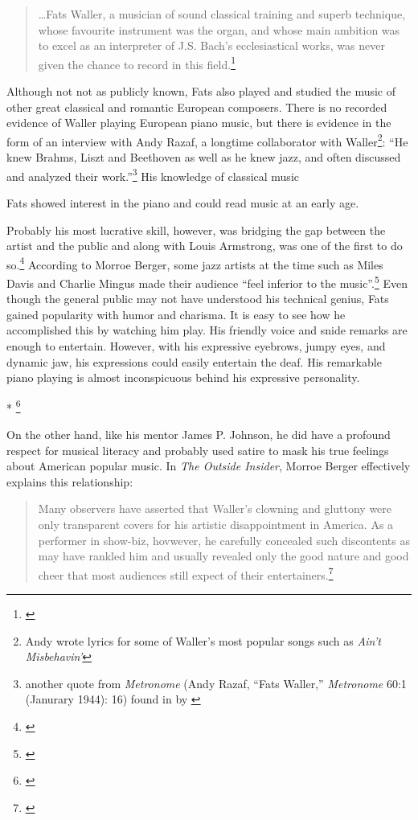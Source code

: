 \documentclass[11pt]{report}
\begin{document}
	\begin{quote}
		\ldots Fats Waller, a musician of sound classical training and superb technique, whose favourite instrument was the organ, and whose main ambition was to excel as an interpreter of J.S. Bach's ecclesiastical works, was never given the chance to record in this field.\footnote{\cite[209]{jazz_scene}}
	\end{quote}
	
	Although not not as publicly known, Fats also played and studied the music of other great classical and romantic European composers. There is no recorded evidence of Waller playing European piano music, but there is evidence in the form of an interview with Andy Razaf, a longtime collaborator with Waller\footnote{Andy wrote lyrics for some of Waller's most popular songs such as \emph{Ain't Misbehavin'}}: ``He knew Brahms, Liszt and Beethoven as well as he knew jazz, and often discussed and analyzed their work.''\footnote{another quote from \emph{Metronome} (Andy Razaf, ``Fats Waller,'' \emph{Metronome} 60:1 (Janurary 1944): 16) found in  by \cite{transcriptions}} His knowledge of classical music
	
	Fats showed interest in the piano and could read music at an early age.

	\label{sec:charisma}
	Probably his most lucrative skill, however, was bridging the gap between the artist and the public and along with Louis Armstrong, was one of the first to do so.\footnote{\cite[3]{life}} According to Morroe Berger, some jazz artists at the time such as Miles Davis and Charlie Mingus made their audience ``feel inferior to the music''.\footnote{\cite[16]{outside-insider}} Even though the general public may not have understood his technical genius, Fats gained popularity with humor and charisma. It is easy to see how he accomplished this by watching him play. His friendly voice and snide remarks are enough to entertain. However, with his expressive eyebrows, jumpy eyes, and dynamic jaw, his expressions could easily entertain the deaf. His remarkable piano playing is almost inconspicuous behind his expressive personality.
	
	* \footnote{\cite{youtube-joint_is_jumpin}}
	
		
	\label{sec:respect}
	
	On the other hand, like his mentor James P. Johnson, he did have a profound respect for musical literacy and probably used satire to mask his true feelings about American popular music. In \emph{The Outside Insider}, Morroe Berger effectively explains this relationship:
	\begin{quote}
		Many observers have asserted that Waller's clowning and gluttony were only transparent covers for his artistic disappointment in America. As a performer in show-biz, hovwever, he carefully concealed such discontents as may have rankled him and usually revealed only the good nature and good cheer that most audiences still expect of their entertainers.\footnote{\cite[4]{outside-insider}}
	\end{quote}
\end{document}
